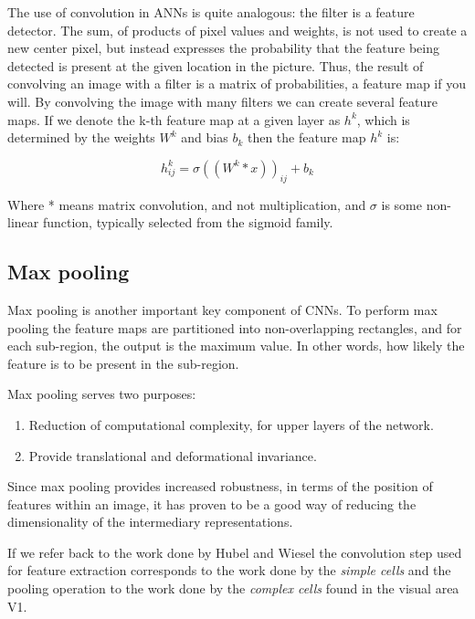 \documentclass[11pt]{article}
\begin{document}
The use of convolution in ANNs is quite analogous: the filter is a feature detector. The sum, of products of pixel values and weights, is not used to create a new center pixel, but instead expresses the probability that the feature being detected is present at the given location in the picture.  Thus, the result of convolving an image with a filter is a matrix of probabilities, a feature map if you will.  By convolving the image with many filters we can create several feature maps.  If we denote the k-th feature map at a given layer as $h^k$, which is determined by the weights $W^k$ and bias $b_k$ then the feature map $h^k$ is:

\begin{displaymath}
  h^{k}_{ij} = \sigma((W^k * x))_{ij} + b_k
\end{displaymath}

Where * means matrix convolution, and not multiplication, and $\sigma$ is some non-linear function, typically selected from the sigmoid family.

\subsection{Max pooling}

Max pooling is another important key component of CNNs.  To perform max pooling the feature maps are partitioned into non-overlapping rectangles, and for each sub-region, the output is the maximum value.  In other words, how likely the feature is to be present in the sub-region.

Max pooling serves two purposes:

\begin{enumerate}
\item Reduction of computational complexity, for upper layers of the network.
\item Provide translational and deformational invariance.
\end{enumerate}

Since max pooling provides increased robustness, in terms of the position of features within an image, it has proven to be a good way of reducing the dimensionality of the intermediary representations.

If we refer back to the work done by Hubel and Wiesel the convolution step used for feature extraction corresponds to the work done by the \textit{simple cells} and the pooling operation to the work done by the \textit{complex cells} found in the visual area V1.
\end{document}
